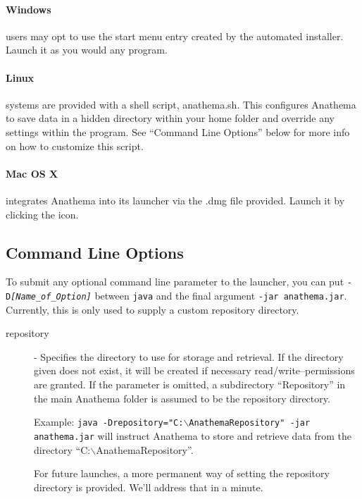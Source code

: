 \paragraph{Windows} users may opt to use the start menu entry created by the automated installer. Launch it as you would any program.

\paragraph{Linux} systems are provided with a shell script, anathema.sh. This configures Anathema to save data in a hidden directory within your home folder and override any settings within the program. See ``Command Line Options'' below for more info on how to customize this script.

\paragraph{Mac OS X} integrates Anathema into its launcher via the .dmg file provided. Launch it by clicking the icon.
  
\subsection{Command Line Options}
To submit any optional command line parameter to the launcher, you can put \linebreak
\texttt{-D\emph{[Name\_of\_Option]}} between \texttt{java} and the final argument \texttt{-jar anathema.jar}. Currently, this is only used to supply a custom repository directory.

\begin{description}
\item[repository] - Specifies the directory to use for storage and retrieval. If the directory given does not exist, it will be created if necessary read/write--permissions are granted. If the parameter is omitted, a subdirectory ``Repository'' in the main Anathema folder is assumed to be the repository directory.

	Example:\newline
	\texttt{java -Drepository="C:$\backslash$AnathemaRepository" -jar anathema.jar} will instruct Anathema to store and retrieve data from the directory 
	\linebreak``C:$\backslash$AnathemaRepository''.
	
For future launches, a more permanent way of setting the repository directory is provided. We'll address that in a minute.
\end{description}

